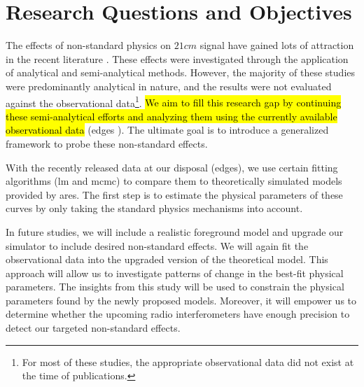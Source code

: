 \documentclass[12pt, TexShade, letterpaper]{report}
\begin{document}
\section{Research Questions and Objectives}
The effects of non-standard physics on $21cm$ signal have gained lots of attraction in the recent literature \cite{WF_effect_oscar, constrain_dm_21, bh_cosmioc_dawn, cosmic_string_oscar}. These effects were investigated through the application of analytical and semi-analytical methods. However, the majority of these studies were predominantly analytical in nature, and the results were not evaluated against the observational data\footnote{For most of these studies, the appropriate observational data did not exist at the time of publications.}. \hl{We aim to fill this research gap by continuing these semi-analytical efforts and analyzing them using the currently available observational data} (\gls{edges} \cite{edges}). The ultimate goal is to introduce a generalized framework to probe these non-standard effects.\par
With the recently released data at our disposal (\gls{edges}\cite{edges}), we use certain fitting algorithms (\gls{lm} and \gls{mcmc}) to compare them to theoretically simulated models provided by \gls{ares}\cite{ares2014jordan}. 
The first step is to estimate the physical parameters of these curves by only taking the standard physics mechanisms into account.\par
In future studies, we will include a realistic foreground model and upgrade our simulator to include desired non-standard effects. We will again fit the observational data into the upgraded version of the theoretical model. This approach will allow us to investigate patterns of change in the best-fit physical parameters. The insights from this study will be used to constrain the physical parameters found by the newly proposed models. Moreover, it will empower us to determine whether the upcoming radio interferometers have enough precision to detect our targeted non-standard effects.\par
\end{document}
